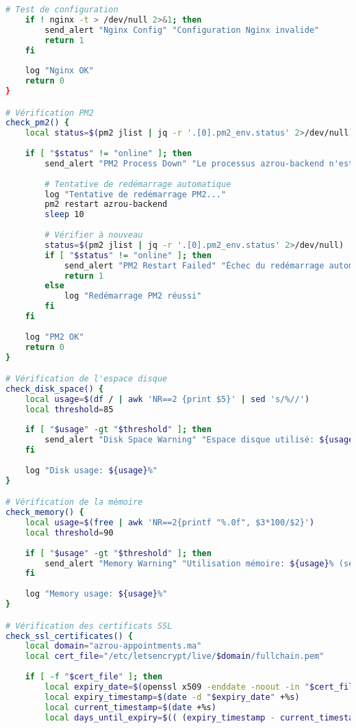 \begin{lstlisting}[language=bash, caption=monitor.sh - Monitoring complet du système]
    # Test de configuration
    if ! nginx -t > /dev/null 2>&1; then
        send_alert "Nginx Config" "Configuration Nginx invalide"
        return 1
    fi
    
    log "Nginx OK"
    return 0
}

# Vérification PM2
check_pm2() {
    local status=$(pm2 jlist | jq -r '.[0].pm2_env.status' 2>/dev/null)
    
    if [ "$status" != "online" ]; then
        send_alert "PM2 Process Down" "Le processus azrou-backend n'est pas en ligne (status: $status)"
        
        # Tentative de redémarrage automatique
        log "Tentative de redémarrage PM2..."
        pm2 restart azrou-backend
        sleep 10
        
        # Vérifier à nouveau
        status=$(pm2 jlist | jq -r '.[0].pm2_env.status' 2>/dev/null)
        if [ "$status" != "online" ]; then
            send_alert "PM2 Restart Failed" "Échec du redémarrage automatique PM2"
            return 1
        else
            log "Redémarrage PM2 réussi"
        fi
    fi
    
    log "PM2 OK"
    return 0
}

# Vérification de l'espace disque
check_disk_space() {
    local usage=$(df / | awk 'NR==2 {print $5}' | sed 's/%//')
    local threshold=85
    
    if [ "$usage" -gt "$threshold" ]; then
        send_alert "Disk Space Warning" "Espace disque utilisé: ${usage}% (seuil: ${threshold}%)"
    fi
    
    log "Disk usage: ${usage}%"
}

# Vérification de la mémoire
check_memory() {
    local usage=$(free | awk 'NR==2{printf "%.0f", $3*100/$2}')
    local threshold=90
    
    if [ "$usage" -gt "$threshold" ]; then
        send_alert "Memory Warning" "Utilisation mémoire: ${usage}% (seuil: ${threshold}%)"
    fi
    
    log "Memory usage: ${usage}%"
}

# Vérification des certificats SSL
check_ssl_certificates() {
    local domain="azrou-appointments.ma"
    local cert_file="/etc/letsencrypt/live/$domain/fullchain.pem"
    
    if [ -f "$cert_file" ]; then
        local expiry_date=$(openssl x509 -enddate -noout -in "$cert_file" | cut -d= -f2)
        local expiry_timestamp=$(date -d "$expiry_date" +%s)
        local current_timestamp=$(date +%s)
        local days_until_expiry=$(( (expiry_timestamp - current_timestamp) / 86400 ))
        

\end{lstlisting}
